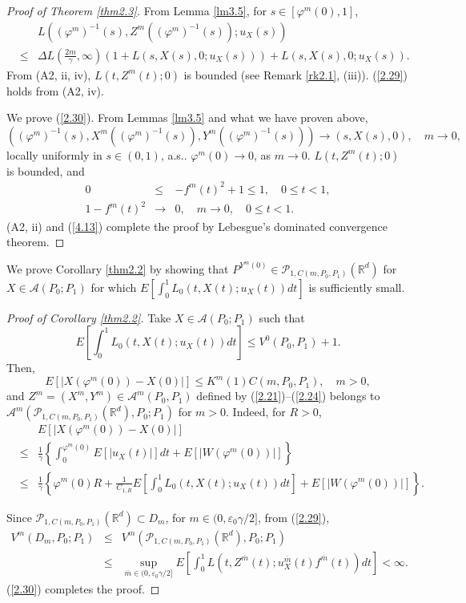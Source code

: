 \documentclass[12pt]{article}
\begin{document}
\begin{proof}[Proof of Theorem \ref{thm2.3}]
From Lemma \ref{lm3.5}, for $s\in [\varphi^m(0),1]$,
\begin{eqnarray}\label{4.13}
&&L((\varphi^m)^{-1}(s), Z^m((\varphi^m)^{-1}(s));u_X(s))
\\
& \le& \Delta L\left(\frac{2m}{\gamma},\infty\right)
(1+L(s, X(s), 0; u_X(s)))+L(s, X(s), 0;u_X(s)).\nonumber
\end{eqnarray}
From (A2, ii, iv), $L(t, Z^m(t); 0)$ is bounded (see Remark \ref{rk2.1}, (iii)).
(\ref{2.29}) holds from (A2, iv).

We prove (\ref{2.30}).
From Lemmas \ref{lm3.5} and what we have proven above, 
$$((\varphi^m)^{-1}(s), X^m((\varphi^m)^{-1}(s)), Y^m((\varphi^m)^{-1}(s)))\to (s, X(s), 0), \quad m\to 0,$$
locally uniformly in $s\in (0,1)$, a.s..
$\varphi^m(0)\to 0$, as $m\to 0$.
$L(t, Z^m(t); 0)$ is bounded, and 
\begin{eqnarray*}
0&\le& -f^m(t)^2+1\le 1,  \quad 0\le t<1,\\
1-f^m(t)^2&\to& 0, \quad m\to 0, \quad 0\le t<1.
\end{eqnarray*}
(A2, ii) and (\ref{4.13}) complete the proof by Lebesgue's dominated convergence theorem.

\end{proof}




We prove Corollary \ref{thm2.2}
by showing that $P^{Y^m(0)}\in \mathcal{P}_{1,C(m,P_0,P_1)}(\mathbb{R}^d)$ for $X\in\mathcal{A}(P_0;P_1)$ for which $E\left[\int_0^1L_0(t,X(t);u_X(t))dt\right]$ is sufficiently small.
 
\begin{proof}[Proof of Corollary \ref{thm2.2}]
Take $X\in\mathcal{A}(P_0;P_1)$ such that 
$$E\left[\int_0^1L_0(t,X(t);u_X(t))dt\right]\le V^0(P_0,P_1)+1.$$
Then,  
\begin{equation}
E[|X(\varphi^m (0))-X(0)|]\le  K^m(1)C(m,P_0,P_1), \quad m>0,
\end{equation}
and $Z^m=(X^m, Y^m)\in \mathcal{A}^m(P_0, P_1)$ defined by  (\ref{2.21})--(\ref{2.24})
belongs to $\mathcal{A}^m(\mathcal{P}_{1,C(m,P_0,P_1)}(\mathbb{R}^d),P_0;P_1)$ for $m>0$.
Indeed, for $R>0$,
\begin{eqnarray*}
&&E[|X(\varphi^m (0))-X(0)|]\\
&\le& \frac{1}{\gamma}\left\{\int_0^{\varphi^m (0)}E[|u_X(t)|]dt+E[|W(\varphi^m (0))|]\right\}\\
&\le& \frac{1}{\gamma}\left\{\varphi^m (0) R+\frac{1}{C_{1,R}}E
\left[\int_0^1L_0(t,X(t);u_X(t))dt\right]+E[|W(\varphi^m (0))|]\right\}.
\end{eqnarray*}

Since $\mathcal{P}_{1,C(m,P_0,P_1)}(\mathbb{R}^d)\subset D_m$, for $m\in (0,
\varepsilon_0\gamma/2]$, from (\ref{2.29}), 
\begin{eqnarray}
V^m(D_m,P_0;P_1)&\le &V^m(\mathcal{P}_{1,C(m,P_0,P_1)}(\mathbb{R}^d),P_0;P_1)\\
&\le&
\sup_{\overline m\in (0, \varepsilon_0\gamma/2]}E\left[\int_0^1L(t, Z^{\overline m}(t);u_X^{\overline m}(t)f^{\overline m}(t))dt\right]<\infty.\nonumber
\end{eqnarray}
(\ref{2.30}) completes the proof.
\end{proof}
\end{document}
